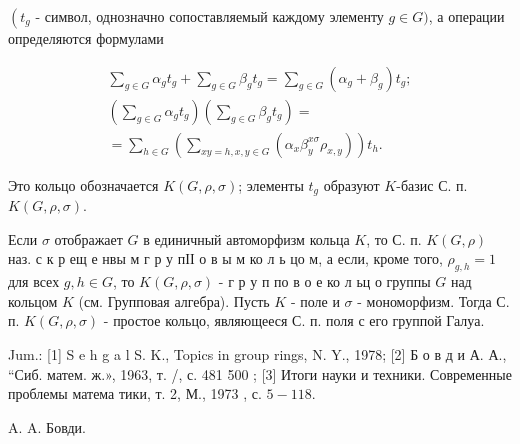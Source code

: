 \documentclass[10pt]{article}
\begin{document}
$\left(t_{g}\right.$ - символ, однозначно сопоставляемый каждому элементу $g \in G)$, а операции определяются формулами



\[

\begin{gathered}

\sum_{g \in G} \alpha_{g} t_{g}+\sum_{g \in G} \beta_{g} t_{g}=\sum_{g \in G}\left(\alpha_{g}+\beta_{g}\right) t_{g} ; \\

\left(\sum_{g \in G} \alpha_{g} t_{g}\right)\left(\sum_{g \in G} \beta_{g} t_{g}\right)= \\

=\sum_{h \in G}\left(\sum_{x y=h, x, y \in G}\left(\alpha_{x} \beta_{y}^{x \sigma} \rho_{x, y}\right)\right) t_{h} .

\end{gathered}

\]



Это кольцо обозначается $K(G, \rho, \sigma)$; элементы $t_{g}$ образуют $K$-базис С. п. $K(G, \rho, \sigma)$.



Если $\sigma$ отображает $G$ в единичный автоморфизм кольца $K$, то С. п. $K(G, \rho)$ наз. с к р ещ е нвы м г р у пІІ о в ы м ко л ь цо м, а если, кроме того, $\rho_{g, h}=1$ для всех $g, h \in G$, то $K(G, \rho, \sigma)$ - г р у п по в о е ко л ьц о группы $G$ над кольцом $K$ (см. Групповая алгебра). Пусть $K$ - поле и $\sigma$ - мономорфизм. Тогда С. п. $K(G, \rho, \sigma)$ - простое кольцо, являющееся С. п. поля с его группой Галуа.



Jum.: [1] S e h g a l S. K., Topics in group rings, N. Y., 1978; [2] Б о в д и А. А., “Сиб. матем. ж.», 1963, т. /, с. 481 500 ; [3] Итоги науки и техники. Современные проблемы матема тики, т. 2, М., 1973 , с. $5-118$.



A. A. Бовди.
\end{document}

